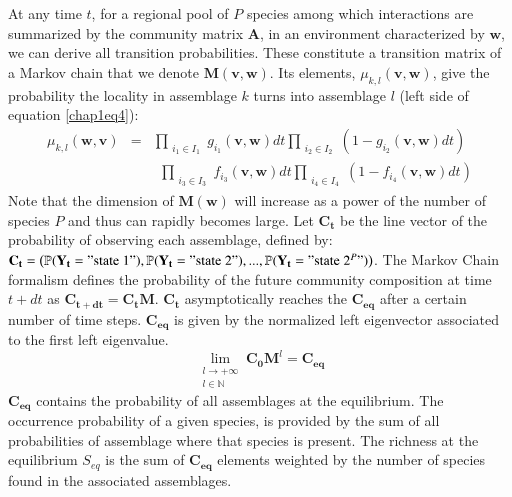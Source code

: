 At any time $t$, for a regional pool of $P$ species among which interactions are summarized by the community matrix $\mathbf{A}$, in an environment characterized by $\mathbf{w}$, we can derive all transition probabilities. These constitute a transition matrix of a Markov chain that we denote $\mathbf{M}(\mathbf{v,w})$. Its elements, $\mu_{k,l}(\mathbf{v,w})$, give the probability the locality in assemblage $k$ turns into assemblage $l$ (left side of equation \eqref{chap1eq4}):
\begin{eqnarray}
\nonumber \mu_{k,l}(\mathbf{w,v}) &=& \prod_{\substack{i_1\in I_1}}g_{i_1}(\mathbf{v}, \mathbf{w})dt \prod_{\substack{i_2\in I_2}}(1-g_{i_2}(\mathbf{v}, \mathbf{w})dt) \\
\label{chap1eq6} & & ~~ \prod_{\substack{i_3\in I_3}}f_{i_3}(\mathbf{v}, \mathbf{w})dt \prod_{\substack{i_4\in I_4}}(1-f_{i_4}(\mathbf{v}, \mathbf{w})dt)
\end{eqnarray}
Note that the dimension of $\mathbf{M}(\mathbf{w})$ will increase as a power of the number of species $P$ and thus can rapidly becomes large. Let $\mathbf{C_t}$ be the line vector of the probability of observing each assemblage, defined by: $\mathbf{C_t}=\big(\mathbb{P}(\mathbf{Y_t}="\text{state }1"), \mathbb{P}(\mathbf{Y_t}="\text{state }2"),..., \mathbb{P}(\mathbf{Y_t}="\text{state }2^P")\big)$. The Markov Chain formalism defines the probability of the future community composition at time $t+dt$ as $ \mathbf{C_{t+dt}}=\mathbf{C_t}\mathbf{M}$. $\mathbf{C_t}$ asymptotically reaches the $\mathbf{C_{eq}}$ after a certain number of time steps. $\mathbf{C_{eq}}$ is given by the normalized left eigenvector associated to the first left eigenvalue.
\begin{equation}
\label{chap1eq7}
\lim\limits_{\substack{l \to +\infty \\ l \in \mathbb{N}}} \mathbf{C_0}\mathbf{M}^l=\mathbf{C_{eq}}
\end{equation}
$\mathbf{C_{eq}}$ contains the probability of all assemblages at the equilibrium. The occurrence probability of a given species, is provided by the sum of all probabilities of assemblage where that species is present. The richness at the equilibrium $S_{eq}$ is the sum of $\mathbf{C_{eq}}$ elements weighted by the number of species found in the associated assemblages.


